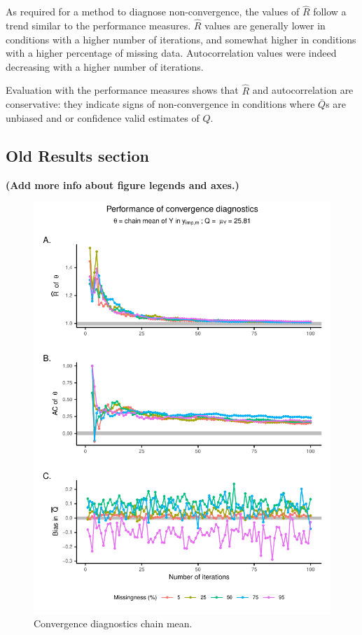 \documentclass[Royal,times,sageh]{sagej}
\begin{document}
As required for a method to diagnose non-convergence, the values of
\(\widehat{R}\) follow a trend similar to the performance measures.
\(\widehat{R}\) values are generally lower in conditions with a higher
number of iterations, and somewhat higher in conditions with a higher
percentage of missing data. Autocorrelation values were indeed
decreasing with a higher number of iterations.

Evaluation with the performance measures shows that \(\widehat{R}\) and
autocorrelation are conservative: they indicate signs of non-convergence
in conditions where \(\bar{Q}\)s are unbiased and or confidence valid
estimates of \(Q\).

\hypertarget{old-results-section}{%
\subsection{Old Results section}\label{old-results-section}}

\textbf{(Add more info about figure legends and axes.)}

\begin{figure}

{\centering \includegraphics{manuscript_files/figure-latex/mean-1} 

}

\caption{Convergence diagnostics chain mean.}\label{fig:mean}
\end{figure}
\end{document}
